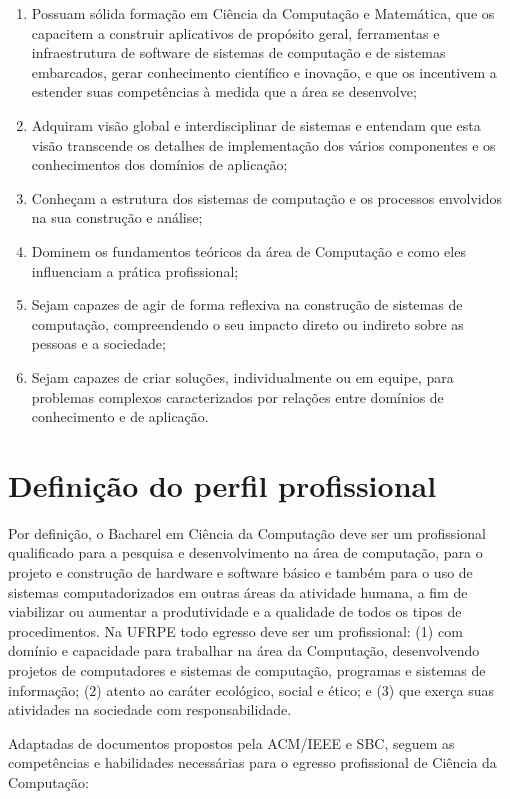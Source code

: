 \begin{enumerate}
    \item Possuam sólida formação em Ciência da Computação e Matemática, que os capacitem a construir aplicativos de propósito geral, ferramentas e infraestrutura de software de sistemas de computação e de sistemas embarcados, gerar conhecimento científico e inovação, e que os incentivem a estender suas competências à medida que a área se desenvolve;
    \item Adquiram visão global e interdisciplinar de sistemas e entendam que esta visão transcende os detalhes de implementação dos vários componentes e os conhecimentos dos domínios de aplicação;
    \item Conheçam a estrutura dos sistemas de computação e os processos envolvidos na sua construção e análise;
    \item Dominem os fundamentos teóricos da área de Computação e como eles influenciam a prática profissional;
    \item Sejam capazes de agir de forma reflexiva na construção de sistemas de computação, compreendendo o seu impacto direto ou indireto sobre as pessoas e a sociedade;
    \item Sejam capazes de criar soluções, individualmente ou em equipe, para problemas complexos caracterizados por relações entre domínios de conhecimento e de aplicação.
\end{enumerate}

\section{Definição do perfil profissional}

Por definição, o Bacharel em Ciência da Computação deve ser um profissional qualificado para a pesquisa e desenvolvimento na área de computação, para o projeto e construção de hardware e software básico e também para o uso de sistemas computadorizados em outras áreas da atividade humana, a fim de viabilizar ou aumentar a produtividade e a qualidade de todos os tipos de procedimentos. Na UFRPE todo egresso deve ser um profissional: (1) com domínio e capacidade para trabalhar na área da Computação, desenvolvendo projetos de computadores e sistemas de computação, programas e sistemas de informação; (2) atento ao caráter ecológico, social e ético; e (3) que exerça suas atividades na sociedade com responsabilidade.

Adaptadas de documentos propostos pela ACM/IEEE e SBC, seguem as competências e habilidades necessárias para o egresso profissional de Ciência da Computação:

